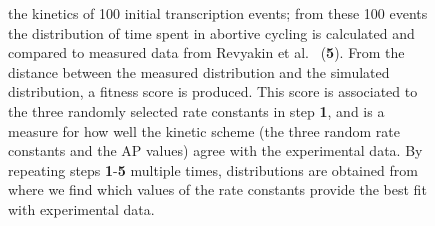 \begin{figure}[h]
{    the kinetics of 100 initial transcription events; from these 100 events
    the distribution of time spent in abortive cycling is calculated and
    compared to measured data from Revyakin et al.\
    \cite{revyakin_abortive_2006} (\textbf{5}). From the distance between the
    measured distribution and the simulated distribution, a fitness score is
    produced. This score is associated to the three randomly selected rate
    constants in step \textbf{1}, and is a measure for how well the kinetic
    scheme (the three random rate constants and the AP values) agree with the
    experimental data. By repeating steps \textbf{1}-\textbf{5} multiple
    times, distributions are obtained from where we find which values of the
    rate constants provide the best fit with experimental data.}
    \label{fig:param_estimation_scheme}
\end{figure}
